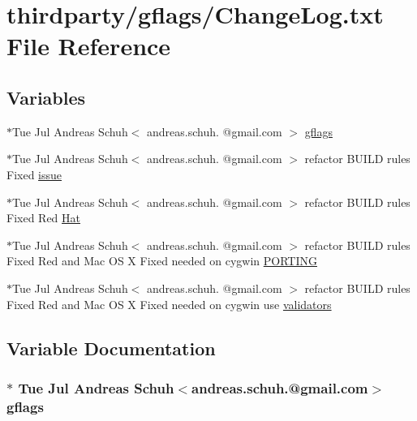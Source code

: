 \hypertarget{ChangeLog_8txt}{}\section{thirdparty/gflags/\+Change\+Log.txt File Reference}
\label{ChangeLog_8txt}
\subsection*{Variables}
\begin{DoxyCompactItemize}
\item 
$\ast$Tue Jul Andreas Schuh$<$ andreas.\+schuh. @gmail.\+com $>$ \hyperlink{ChangeLog_8txt_a47628157e24b2f95754a29dd48dfe48e}{gflags}
\item 
$\ast$Tue Jul Andreas Schuh$<$ andreas.\+schuh. @gmail.\+com $>$ refactor B\+U\+I\+LD rules Fixed \hyperlink{ChangeLog_8txt_a9ee32034872bd5334c09a83bf666f31f}{issue}
\item 
$\ast$Tue Jul Andreas Schuh$<$ andreas.\+schuh. @gmail.\+com $>$ refactor B\+U\+I\+LD rules Fixed Red \hyperlink{ChangeLog_8txt_ab6af3f9cddd94679b669cc1d47b9797d}{Hat}
\item 
$\ast$Tue Jul Andreas Schuh$<$ andreas.\+schuh. @gmail.\+com $>$ refactor B\+U\+I\+LD rules Fixed Red and Mac OS X Fixed needed on cygwin \hyperlink{ChangeLog_8txt_a3b1b71f7c8079cb927f9139037c375f6}{P\+O\+R\+T\+I\+NG}
\item 
$\ast$Tue Jul Andreas Schuh$<$ andreas.\+schuh. @gmail.\+com $>$ refactor B\+U\+I\+LD rules Fixed Red and Mac OS X Fixed needed on cygwin use \hyperlink{ChangeLog_8txt_a463f52dbd9b85614adaa6471eb5fc93d}{validators}
\end{DoxyCompactItemize}


\subsection{Variable Documentation}
\subsubsection[{\texorpdfstring{gflags}{gflags}}]{\setlength{\rightskip}{0pt plus 5cm}$\ast$ Tue Jul Andreas Schuh$<$andreas.\+schuh.@gmail.\+com$>$ gflags}\hypertarget{ChangeLog_8txt_a47628157e24b2f95754a29dd48dfe48e}{}\label{ChangeLog_8txt_a47628157e24b2f95754a29dd48dfe48e}



